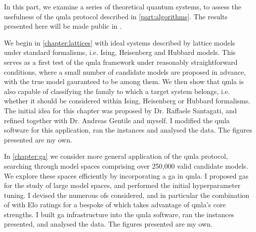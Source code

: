 
In this part, we examine a series of theoretical quantum systems, 
    to assess the usefulness of the \gls{qmla} protocol described in \cref{part:algorithms}.
The results presented here will be made public in \cite{flynn2021Quantum}.
\par 
\vspace{1cm}

We begin in \cref{chapter:lattices} with ideal systems described by lattice models 
    under standard formalisms, i.e. Ising, Heisenberg and Hubbard models. 
This serves as a first test of the \gls{qmla} framework under reasonably straightforward
    conditions, where a small number of candidate models are proposed in advance, 
    with the \gls{true model} gauranteed to be among them. 
We then show that \gls{qmla} is also capable of classifying the family to which a target system belongs, 
    i.e. whether it should be considered within Ising, Heisenberg or Hubbard formalisms. 
The initial idea for this chapter was proposed by Dr. Raffaele Santagati, 
    and refined together with Dr. Andreas Gentile and myself. 
I modified the \gls{qmla} software for this application, 
    ran the \glspl{instance} and analysed the data. 
The figures presented are my own.

\par 
\vspace{1cm}
In \cref{chapter:ga} we consider more general application of the \gls{qmla} protocol, 
    searching through model spaces comprising over 250,000 valid candidate models. 
We explore these spaces efficiently by incorporating a \acrfull{ga} in \gls{qmla}. 
I proposed \glspl{ga} for the study of large model spaces, 
    and performed the initial \gls{hyperparameter} tuning. 
I devised the numerous \glspl{of} considered, 
    and in particular the combination of 
    with Elo ratings for a bespoke \gls{of} which takes advantage of \gls{qmla}'s core strengths. 
I built \gls{ga} infrastructure into the \gls{qmla} software, 
    ran the \glspl{instance} presented, and analysed the data.
The figures presented are my own. 
\par 